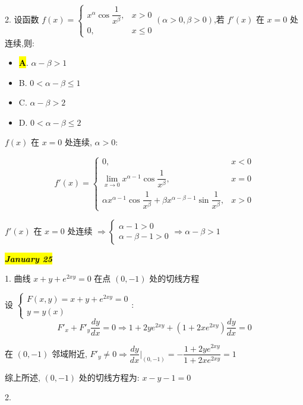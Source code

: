2. 设函数 $f(x)=\begin{cases}
	x^{\alpha}\cos\dfrac{1}{x^{\beta}}, & x>0\\
	0,& x\leq 0
\end{cases}(\alpha>0,\beta>0)$,若 $f'(x)$ 在 $x=0$ 处连续,则:
\begin{itemize}
	\item \hl{\textbf{A}}. $\alpha-\beta>1$
	\item B. $0<\alpha-\beta\leq 1$
	\item C. $\alpha-\beta>2$
	\item D. $0<\alpha-\beta\leq 2$
\end{itemize}
\begin{solution}

	$f(x)$ 在 $x = 0$ 处连续, $\alpha > 0$:

	$$f'(x) = 
	\begin{cases}
		0, & x< 0\\
		\lim\limits_{x\to 0} x^{\alpha -1}\cos\dfrac{1}{x^{\beta}}, & x = 0\\
		\alpha x^{\alpha -1}\cos \dfrac{1}{x^{\beta}} + \beta x^{\alpha-\beta-1}\sin \dfrac{1}{x^{\beta}}, & x > 0  
	\end{cases}$$

	$f'(x)$ 在 $x = 0$ 处连续 $\Rightarrow \begin{cases} \alpha - 1 >0\\ \alpha - \beta - 1 > 0\end{cases}\Rightarrow \alpha - \beta > 1$
\end{solution}

\hl{\textbf{\textit{January 25}}}

1. 曲线 $x+y+e^{2xy}=0$ 在点 $(0,-1)$ 处的切线方程
\begin{solution}

	设 $\begin{cases}
		F(x,y) = x + y + e^{2xy} = 0\\
		y = y(x)
	\end{cases}$:
	$$F'_{x} + F'_{y}\dfrac{dy}{dx} = 0\Rightarrow 1+2ye^{2xy}+(1+2xe^{2xy})\dfrac{dy}{dx} =0$$

	在 $(0,-1)$ 邻域附近, $F'_{y}\neq 0\Rightarrow \dfrac{dy}{dx}\big|_{(0,-1)} = -\dfrac{1+2ye^{2xy}}{1+2xe^{2xy}} = 1$

	综上所述, $(0,-1)$ 处的切线方程为: $x - y - 1 = 0$
\end{solution}

2.

